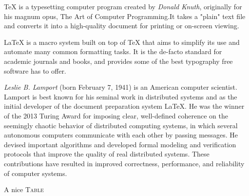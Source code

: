 \documentclass[11pt]{article}
\begin{document}
\TeX{} is a typesetting computer program created by \emph{Donald Knuth},
originally for his magnum opus, \textsf{The Art of Computer
  Programming}.It takes a "plain" text file and converts it into a
high-quality document for printing or on-screen viewing.

\LaTeX{} is a macro system built on top of \TeX{} that aims to simplify its
use and automate many common formatting tasks. It is the de-facto
standard for academic journals and books, and provides some of the best
typography free software has to offer.



\emph{Leslie B. Lamport} (born February 7, 1941) is an American computer
scientist. Lamport is best known for his seminal work in distributed
systems and as the initial developer of the document preparation system
\LaTeX. He was the winner of the 2013 Turing Award for imposing clear,
well-defined coherence on the seemingly chaotic behavior of distributed
computing systems, in which several autonomous computers communicate
with each other by passing messages. He devised important algorithms and
developed formal modeling and verification protocols that improve the
quality of real distributed systems. These contributions have resulted
in improved correctness, performance, and reliability of computer
systems.

\begin{table}[h]
  
  \caption{A nice \textsc{Table}}
\end{table}
\end{document}

